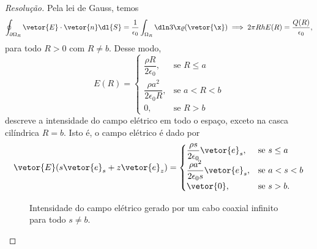 \begin{proof}[Resolução]
    Pela lei de Gauss, temos
    \begin{equation*}
        \oint_{\partial \Omega_R} \vetor{E}\cdot \vetor{n} \dl{S} = \frac{1}{\epsilon_0} \int_{\Omega_R}\dln3\x \varrho(\vetor{\x}) \implies 2\pi R h E(R) = \frac{Q(R)}{\epsilon_0},
    \end{equation*}
    para todo \(R > 0\) com \(R \neq b\). Desse modo,
    \begin{equation*}
        E(R) = \begin{cases}
            \dfrac{\rho R}{2 \epsilon_0},&\text{se }R \leq a\\
            \dfrac{\rho a^2}{2 \epsilon_0 R}, &\text{se }a < R < b\\
            0,&\text{se }R > b
        \end{cases}
    \end{equation*}
    descreve a intensidade do campo elétrico em todo o espaço, exceto na casca cilíndrica \(R = b\). Isto é, o campo elétrico é dado por
    \begin{equation*}
        \vetor{E}(s \vetor{e}_s + z \vetor{e}_z) = \begin{cases}
            \dfrac{\rho s}{2 \epsilon_0}\vetor{e}_s,&\text{se }s \leq a\\
            \dfrac{\rho a^2}{2 \epsilon_0 s}\vetor{e}_s, &\text{se }a < s < b\\
            \vetor{0},&\text{se }s > b.
        \end{cases}
    \end{equation*}

    \begin{figure}[!ht]
        \centering
        \caption{Intensidade do campo elétrico gerado por um cabo coaxial infinito para todo \(s \neq b\).}
    \end{figure}


\end{proof}
